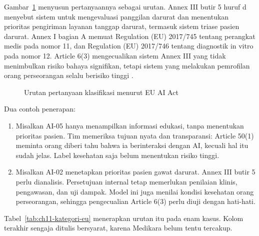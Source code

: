 Gambar~\ref{fig:ch11-klasifikasi} menyusun pertanyaannya sebagai urutan. Annex III butir 5 huruf d
menyebut sistem untuk mengevaluasi panggilan darurat dan menentukan prioritas pengiriman layanan
tanggap darurat, termasuk sistem triase pasien darurat. Annex I bagian A memuat Regulation (EU)
2017/745 tentang perangkat medis pada nomor 11, dan Regulation (EU) 2017/746 tentang diagnostik in
vitro pada nomor 12. Article 6(3) mengecualikan sistem Annex III yang tidak menimbulkan risiko
bahaya signifikan, tetapi sistem yang melakukan pemrofilan orang perseorangan selalu berisiko tinggi
\cite{c11-aiact-explorer}.

\begin{figure}[!htb]
  \centering
  
  \caption{Urutan pertanyaan klasifikasi menurut EU AI Act}
  \label{fig:ch11-klasifikasi}
\end{figure}

Dua contoh penerapan:
\begin{enumerate}
  \item Misalkan AI-05 hanya menampilkan informasi edukasi, tanpa menentukan prioritas pasien. Tim
  memeriksa tujuan nyata dan transparansi: Article 50(1) meminta orang diberi tahu bahwa ia
  berinteraksi dengan AI, kecuali hal itu sudah jelas. Label kesehatan saja belum menentukan risiko
  tinggi.
  \item Misalkan AI-02 menetapkan prioritas pasien gawat darurat. Annex III butir 5 perlu
  dianalisis. Persetujuan internal tetap memerlukan penilaian klinis, pengawasan, dan uji dampak.
  Model ini juga menilai kondisi kesehatan orang perseorangan, sehingga pengecualian Article 6(3)
  perlu diuji dengan hati-hati.
\end{enumerate}

Tabel~\ref{tab:ch11-kategori-eu} menerapkan urutan itu pada enam kasus. Kolom terakhir sengaja
ditulis bersyarat, karena Medikara belum tentu tercakup.

